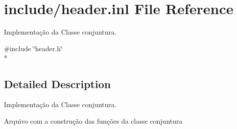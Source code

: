 \hypertarget{header_8inl}{}\section{include/header.inl File Reference}
\label{header_8inl}


Implementação da Classe conjuntura.  


{\ttfamily \#include \char`\"{}header.\+h\char`\"{}}\\*


\subsection{Detailed Description}
Implementação da Classe conjuntura. 

Arquivo com a construção das funções da classe conjuntura 